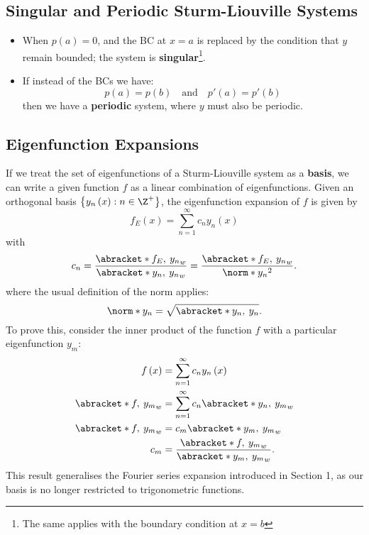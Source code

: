 \documentclass{article}
\begin{document}
\subsection{Singular and Periodic Sturm-Liouville Systems}
\begin{itemize}
    \item When \(p\left( a \right) = 0\), and the BC at \(x = a\) is
          replaced by the condition that \(y\) remain bounded; the
          system is \textbf{singular}\footnote{The same applies with
          the boundary condition at \(x = b\)}.
    \item If instead of the BCs we have:
          \begin{equation*}
              p\left( a \right) = p\left( b \right) \quad \text{and} \quad p'\left( a \right) = p'\left( b \right)
          \end{equation*}
          then we have a \textbf{periodic} system, where \(y\) must also be periodic.
\end{itemize}
\subsection{Eigenfunction Expansions}
If we treat the set of eigenfunctions of a Sturm-Liouville system as a
\textbf{basis}, we can write a given function \(f\) as a linear
combination of eigenfunctions. Given an orthogonal basis \(\left\{
y_n\left( x \right) : n \in \Z^{+} \right\}\), the eigenfunction
expansion of \(f\) is given by
\begin{equation*}
    f_E\left( x \right) = \sum_{n = 1}^\infty c_n y_n\left( x \right)
\end{equation*}
with
\begin{equation*}
    c_n = \frac{\abracket*{f_E,\: y_n}_w}{\abracket*{y_n,\: y_n}_w} = \frac{\abracket*{f_E,\: y_n}_w}{\norm*{y_n}^2}.
\end{equation*}
where the usual definition of the norm applies:
\begin{equation*}
    \norm*{y_n} = \sqrt{\abracket*{y_n,\: y_n}}.
\end{equation*}
To prove this, consider the inner product of the function \(f\) with
a particular eigenfunction \(y_m\):
\begin{align*}
    f\left( x \right)      & = \sum_{n = 1}^\infty c_n y_n\left( x \right)              \\
    \abracket*{f,\: y_m}_w & = \sum_{n = 1}^\infty c_n \abracket*{y_n,\: y_m}_w         \\
    \abracket*{f,\: y_m}_w & = c_m \abracket*{y_m,\: y_m}_w                             \\
    c_m                    & = \frac{\abracket*{f,\: y_m}_w}{\abracket*{y_m,\: y_m}_w}.
\end{align*}
This result generalises the Fourier series expansion introduced in Section 1, as our basis
is no longer restricted to trigonometric functions.
\end{document}
